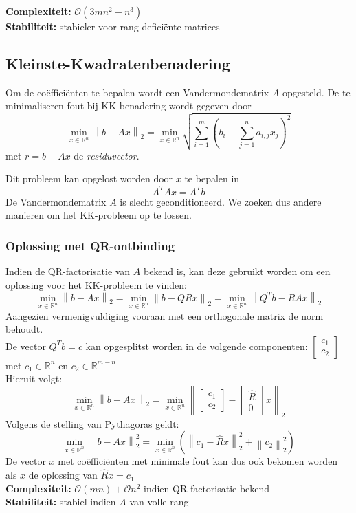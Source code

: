 \documentclass{article}
\newcommand{\norm}[1]{\left\lVert#1\right\rVert}
\begin{document}
	\textbf{Complexiteit:} $\mathcal{O}(3mn^2 - n^3)$ \\
	\textbf{Stabiliteit:} stabieler voor rang-deficiënte matrices
	
	
	\subsection{Kleinste-Kwadratenbenadering}
	Om de coëfficiënten te bepalen wordt een Vandermondematrix $A$ opgesteld. 
	De te minimaliseren fout bij KK-benadering wordt gegeven door
	$$
	\min_{x \in \mathbb{R}^n} \norm{b-Ax}_2 
	= \min_{x \in \mathbb{R}^n} \sqrt{\sum_{i=1}^{m}(b_i - \sum_{j=1}^{n}a_{i,j}x_j)^2}
	$$
	met $r=b-Ax$ de \textit{residuvector}.
	
	Dit probleem kan opgelost worden door $x$ te bepalen in 
	$$
	A^TAx = A^Tb
	$$
	De Vandermondematrix $A$ is slecht geconditioneerd. We zoeken dus andere manieren om het KK-probleem op te lossen.\\
	
	\subsubsection{Oplossing met QR-ontbinding}
	
	Indien de QR-factorisatie van $A$ bekend is, kan deze gebruikt worden om een oplossing voor het KK-probleem te vinden:
	$$
	\min_{x \in \mathbb{R}^n} \norm{b-Ax}_2  
	= \min_{x \in \mathbb{R}^n} \norm{b-QRx}_2
	= \min_{x \in \mathbb{R}^n} \norm{Q^Tb-RAx}_2 
	$$
	Aangezien vermenigvuldiging vooraan met een orthogonale matrix de norm behoudt. \\	
	De  vector $Q^Tb=c$ kan opgesplitst worden in  de volgende componenten:
	$
	\begin{bmatrix}
		c_1\\
		c_2
	\end{bmatrix}
	$
	met $c_1 \in \mathbb{R}^n$ en $c_2 \in \mathbb{R}^{m-n}$\\
	Hieruit volgt:
	$$
	\min_{x \in \mathbb{R}^n} \norm{b-Ax}_2 
	= 	\min_{x \in \mathbb{R}^n} \norm{
		\begin{bmatrix}
		c_1\\
		c_2
		\end{bmatrix}
		-
		\begin{bmatrix}
			\hat{R}\\
			0
		\end{bmatrix}
		x}_2 
	$$
	Volgens de stelling van Pythagoras geldt:
	$$
	\min_{x \in \mathbb{R}^n} \norm{b-Ax}_2^2
	= \min_{x \in \mathbb{R}^n} (\norm{c_1-\hat{R}x}_2^2 + \norm{c_2}_2^2)
	$$
	De vector $x$ met coëfficiënten met minimale fout kan dus ook bekomen worden als $x$ de oplossing van $\hat{R}x = c_1$\\
	
	\textbf{Complexiteit:} $\mathcal{O}(mn) + \mathcal{O}n^2$ indien QR-factorisatie bekend\\
	\textbf{Stabiliteit:} stabiel indien $A$ van volle rang
	
	
	
\end{document}

